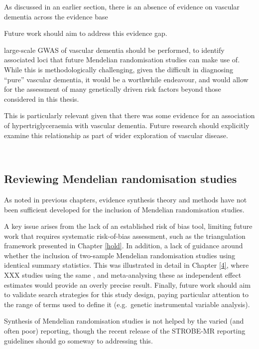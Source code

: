 \documentclass[a4paper, twoside]{templates/ociamthesis}
\begin{document}
As discussed in an earlier section, there is an absence of evidence on vascular dementia across the evidence base

Future work should aim to address this evidence gap.

large-scale GWAS of vascular dementia should be performed, to identify associated loci that future Mendelian randomisation studies can make use of. While this is methodologically challenging, given the difficult in diagnosing ``pure'' vascular dementia, it would be a worthwhile endeavour, and would allow for the assessment of many genetically driven risk factors beyond those considered in this thesis.

This is particularly relevant given that there was some evidence for an association of hypertriglyceraemia with vascular dementia. Future research should explicitly examine this relationship as part of wider exploration of vascular disease.

~\\
\newpage

\hypertarget{reviewing-mendelian-randomisation-studies}{%
\subsection{Reviewing Mendelian randomisation studies}\label{reviewing-mendelian-randomisation-studies}}

As noted in previous chapters, evidence synthesis theory and methods have not been sufficient developed for the inclusion of Mendelian randomisation studies.

A key issue arises from the lack of an established risk of bias tool, limiting future work that requires systematic risk-of-bias assessment, such as the triangulation framework presented in Chapter \ref{hold}. In addition, a lack of guidance around whether the inclusion of two-sample Mendelian randomisation studies using identical summary statistics. This was illustrated in detail in Chapter \ref{4}, where XXX studies using the same , and meta-analysing these as independent effect estimates would provide an overly precise result. Finally, future work should aim to validate search strategies for this study design, paying particular attention to the range of terms used to define it (e.g.~genetic instrumental variable analysis).

Synthesis of Mendelian randomisation studies is not helped by the varied (and often poor) reporting, though the recent release of the STROBE-MR reporting guidelines should go someway to addressing this.
\end{document}
